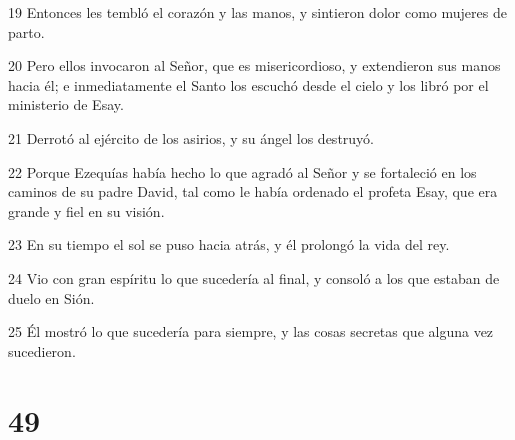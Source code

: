 \par 19 Entonces les tembló el corazón y las manos, y sintieron dolor como mujeres de parto.
\par 20 Pero ellos invocaron al Señor, que es misericordioso, y extendieron sus manos hacia él; e inmediatamente el Santo los escuchó desde el cielo y los libró por el ministerio de Esay.
\par 21 Derrotó al ejército de los asirios, y su ángel los destruyó.
\par 22 Porque Ezequías había hecho lo que agradó al Señor y se fortaleció en los caminos de su padre David, tal como le había ordenado el profeta Esay, que era grande y fiel en su visión.
\par 23 En su tiempo el sol se puso hacia atrás, y él prolongó la vida del rey.
\par 24 Vio con gran espíritu lo que sucedería al final, y consoló a los que estaban de duelo en Sión.
\par 25 Él mostró lo que sucedería para siempre, y las cosas secretas que alguna vez sucedieron.

\chapter{49}

